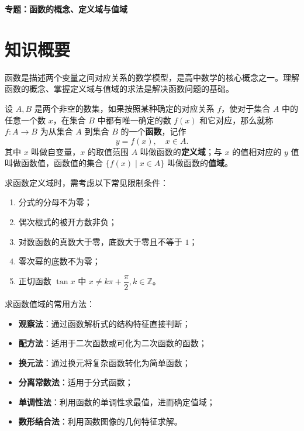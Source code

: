 \documentclass[11pt]{ctexrep}
\begin{document}
\begin{center}
    {\LARGE\bfseries 专题：函数的概念、定义域与值域}
\end{center}

\section*{知识概要}

函数是描述两个变量之间对应关系的数学模型，是高中数学的核心概念之一。理解函数的概念、掌握定义域与值域的求法是解决函数问题的基础。

\begin{definition}[函数的定义]
    设 $A, B$ 是两个非空的数集，如果按照某种确定的对应关系 $f$，使对于集合 $A$ 中的任意一个数 $x$，在集合 $B$ 中都有唯一确定的数 $f(x)$ 和它对应，那么就称 $f: A \to B$ 为从集合 $A$ 到集合 $B$ 的一个\textbf{函数}，记作
    \[
        y = f(x), \quad x \in A.
    \]
    其中 $x$ 叫做自变量，$x$ 的取值范围 $A$ 叫做函数的\textbf{定义域}；与 $x$ 的值相对应的 $y$ 值叫做函数值，函数值的集合 $\{ f(x) \mid x \in A \}$ 叫做函数的\textbf{值域}。
\end{definition}

\begin{property}[定义域的求法]
    求函数定义域时，需考虑以下常见限制条件：
    \begin{enumerate}
        \item 分式的分母不为零；
        \item 偶次根式的被开方数非负；
        \item 对数函数的真数大于零，底数大于零且不等于 $1$；
        \item 零次幂的底数不为零；
        \item 正切函数 $\tan x$ 中 $x \neq k\pi + \dfrac{\pi}{2}, k \in \mathbb{Z}$。
    \end{enumerate}
\end{property}

\begin{property}[值域的求法]
    求函数值域的常用方法：
    \begin{itemize}
        \item \textbf{观察法}：通过函数解析式的结构特征直接判断；
        \item \textbf{配方法}：适用于二次函数或可化为二次函数的函数；
        \item \textbf{换元法}：通过换元将复杂函数转化为简单函数；
        \item \textbf{分离常数法}：适用于分式函数；
        \item \textbf{单调性法}：利用函数的单调性求最值，进而确定值域；
        \item \textbf{数形结合法}：利用函数图像的几何特征求解。
    \end{itemize}
\end{property}
\end{document}
